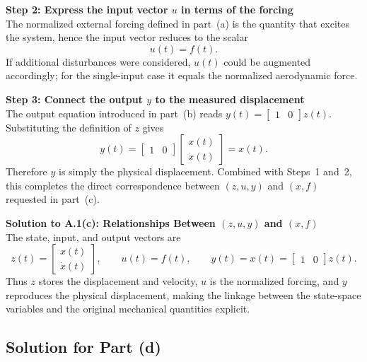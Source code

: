 \documentclass[12pt]{article}
\begin{document}
\begin{stepbox}
\textbf{Step 2: Express the input vector $u$ in terms of the forcing}\\[0.5em]
The normalized external forcing defined in part~(a) is the quantity that excites the system, hence the input vector reduces to the scalar
\[
u(t) = f(t).
\]
If additional disturbances were considered, $u(t)$ could be augmented accordingly; for the single-input case it equals the normalized aerodynamic force.
\end{stepbox}

\begin{stepbox}
\textbf{Step 3: Connect the output $y$ to the measured displacement}\\[0.5em]
The output equation introduced in part~(b) reads $y(t) = \begin{bmatrix} 1 & 0 \end{bmatrix} z(t)$.  Substituting the definition of $z$ gives
\[
y(t) = \begin{bmatrix} 1 & 0 \end{bmatrix} \begin{bmatrix} x(t) \\ \dot{x}(t) \end{bmatrix} = x(t).
\]
Therefore $y$ is simply the physical displacement.  Combined with Steps~1 and~2, this completes the direct correspondence between $(z,u,y)$ and $(x, f)$ requested in part~(c).
\end{stepbox}

\begin{resultsbox}
\textbf{Solution to A.1(c): Relationships Between $(z,u,y)$ and $(x,f)$}\\[0.5em]
The state, input, and output vectors are
\[
z(t) = \begin{bmatrix} x(t) \\ \dot{x}(t) \end{bmatrix}, \qquad u(t) = f(t), \qquad y(t) = x(t) = \begin{bmatrix} 1 & 0 \end{bmatrix} z(t).
\]
Thus $z$ stores the displacement and velocity, $u$ is the normalized forcing, and $y$ reproduces the physical displacement, making the linkage between the state-space variables and the original mechanical quantities explicit.
\end{resultsbox}

\clearpage
\clearpage
\subsection*{Solution for Part (d)}
\end{document}
